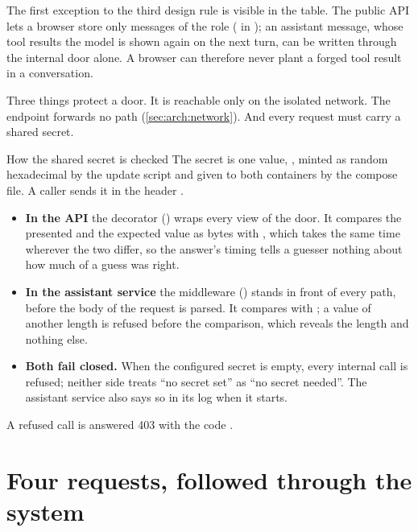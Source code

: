 The first exception to the third design rule is visible in the table. The public API lets a
browser store only messages of the role  ( in
); an assistant message, whose tool results the model is shown again
on the next turn, can be written through the internal door alone. A browser can therefore
never plant a forged tool result in a conversation.

Three things protect a door. It is reachable only on the isolated network. The endpoint
forwards no  path (\cref{sec:arch:network}). And every request must carry a
shared secret.

\begin{codebox}{How the shared secret is checked}
The secret is one value, , minted as random hexadecimal by
the update script and given to both containers by the compose file. A caller sends it in the
header .

\begin{itemize}
  \item \textbf{In the API} the decorator 
    () wraps every view of the door. It compares the
    presented and the expected value as bytes with , which takes
    the same time wherever the two differ, so the answer's timing tells a guesser nothing
    about how much of a guess was right.
  \item \textbf{In the assistant service} the middleware 
    () stands in front of every  path, before
    the body of the request is parsed. It compares with ; a value of
    another length is refused before the comparison, which reveals the length and nothing
    else.
  \item \textbf{Both fail closed.} When the configured secret is empty, every internal call is
    refused; neither side treats \enquote{no secret set} as \enquote{no secret needed}. The
    assistant service also says so in its log when it starts.
\end{itemize}
A refused call is answered 403 with the code .
\end{codebox}

\section{Four requests, followed through the system}\label{sec:arch:flows}


